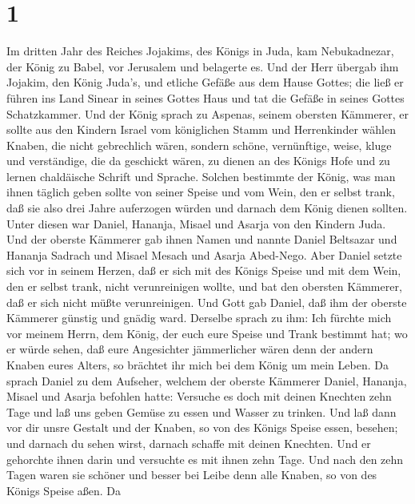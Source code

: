 \hypertarget{section}{%
\section{1}\label{section}}

 Im dritten Jahr des Reiches Jojakims, des Königs in Juda,
kam Nebukadnezar, der König zu Babel, vor Jerusalem und belagerte es.
 Und der Herr übergab ihm Jojakim, den König Juda's, und
etliche Gefäße aus dem Hause Gottes; die ließ er führen ins Land Sinear
in seines Gottes Haus und tat die Gefäße in seines Gottes Schatzkammer.
 Und der König sprach zu Aspenas, seinem obersten Kämmerer,
er sollte aus den Kindern Israel vom königlichen Stamm und Herrenkinder
wählen  Knaben, die nicht gebrechlich wären, sondern schöne,
vernünftige, weise, kluge und verständige, die da geschickt wären, zu
dienen an des Königs Hofe und zu lernen chaldäische Schrift und Sprache.
 Solchen bestimmte der König, was man ihnen täglich geben
sollte von seiner Speise und vom Wein, den er selbst trank, daß sie also
drei Jahre auferzogen würden und darnach dem König dienen sollten.
 Unter diesen war Daniel, Hananja, Misael und Asarja von den
Kindern Juda.  Und der oberste Kämmerer gab ihnen Namen und
nannte Daniel Beltsazar und Hananja Sadrach und Misael Mesach und Asarja
Abed-Nego.  Aber Daniel setzte sich vor in seinem Herzen,
daß er sich mit des Königs Speise und mit dem Wein, den er selbst trank,
nicht verunreinigen wollte, und bat den obersten Kämmerer, daß er sich
nicht müßte verunreinigen.  Und Gott gab Daniel, daß ihm der
oberste Kämmerer günstig und gnädig ward.  Derselbe sprach
zu ihm: Ich fürchte mich vor meinem Herrn, dem König, der euch eure
Speise und Trank bestimmt hat; wo er würde sehen, daß eure Angesichter
jämmerlicher wären denn der andern Knaben eures Alters, so brächtet ihr
mich bei dem König um mein Leben.  Da sprach Daniel zu dem
Aufseher, welchem der oberste Kämmerer Daniel, Hananja, Misael und
Asarja befohlen hatte:  Versuche es doch mit deinen
Knechten zehn Tage und laß uns geben Gemüse zu essen und Wasser zu
trinken.  Und laß dann vor dir unsre Gestalt und der
Knaben, so von des Königs Speise essen, besehen; und darnach du sehen
wirst, darnach schaffe mit deinen Knechten.  Und er
gehorchte ihnen darin und versuchte es mit ihnen zehn Tage.
 Und nach den zehn Tagen waren sie schöner und besser bei
Leibe denn alle Knaben, so von des Königs Speise aßen.  Da

